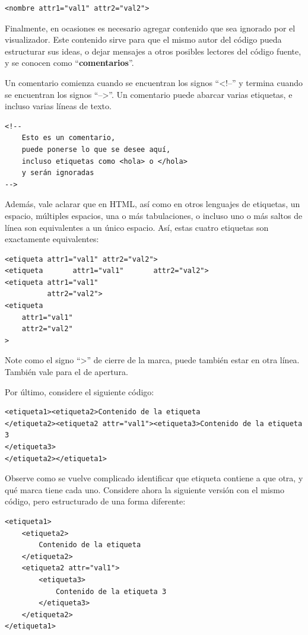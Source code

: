 \begin{lstlisting}[language=XHTML]
<nombre attr1="val1" attr2="val2">
\end{lstlisting}

Finalmente, en ocasiones es necesario agregar contenido que sea ignorado por
el visualizador. Este contenido sirve para que el mismo autor del código pueda
estructurar sus ideas, o dejar mensajes a otros posibles lectores del código
fuente, y se conocen como ``\textbf{comentarios}''.

Un comentario comienza cuando se encuentran los signos ``<!--'' y termina cuando
se encuentran los signos ``-->''. Un comentario puede abarcar varias etiquetas,
e incluso varias líneas de texto.

\begin{lstlisting}[language=XHTML]
<!--
    Esto es un comentario,
    puede ponerse lo que se desee aquí,
    incluso etiquetas como <hola> o </hola>
    y serán ignoradas
-->
\end{lstlisting}

Además, vale aclarar que en HTML, así como en otros lenguajes de etiquetas, un
espacio, múltiples espacios, una o más tabulaciones, o incluso uno o más saltos
de línea son equivalentes a un único espacio. Así, estas cuatro etiquetas son
exactamente equivalentes:

\begin{lstlisting}[language=XHTML]
<etiqueta attr1="val1" attr2="val2">
<etiqueta       attr1="val1"       attr2="val2">
<etiqueta attr1="val1"
          attr2="val2">
<etiqueta
    attr1="val1"
    attr2="val2"
>
\end{lstlisting}

Note como el signo ``>'' de cierre de la marca, puede también estar en otra línea.
También vale para el de apertura.

Por último, considere el siguiente código:
\begin{lstlisting}[language=XHTML]
<etiqueta1><etiqueta2>Contenido de la etiqueta
</etiqueta2><etiqueta2 attr="val1"><etiqueta3>Contenido de la etiqueta 3
</etiqueta3>
</etiqueta2></etiqueta1>
\end{lstlisting}

Observe como se vuelve complicado identificar que etiqueta contiene a que otra,
y qué marca tiene cada uno. Considere ahora la siguiente versión con el mismo
código, pero estructurado de una forma diferente:

\begin{lstlisting}[language=XHTML]
<etiqueta1>
    <etiqueta2>
        Contenido de la etiqueta
    </etiqueta2>
    <etiqueta2 attr="val1">
        <etiqueta3>
            Contenido de la etiqueta 3
        </etiqueta3>
    </etiqueta2>
</etiqueta1>
\end{lstlisting}

